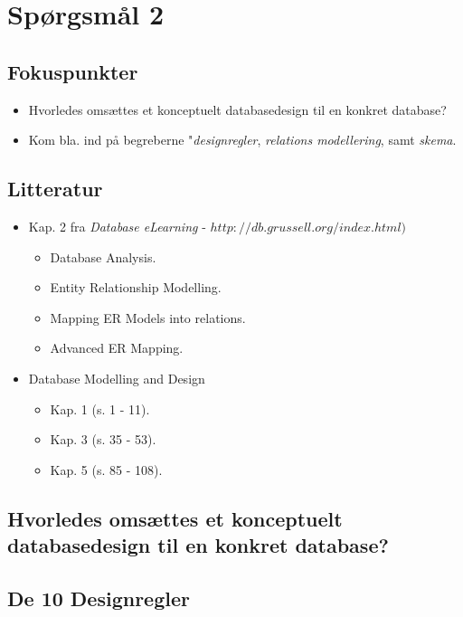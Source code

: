 \section{Spørgsmål 2}

\subsection{Fokuspunkter}
\begin{itemize}
	\item Hvorledes omsættes et konceptuelt databasedesign til en konkret database?
	\item Kom bla. ind på begreberne "\textit{designregler}, \textit{relations modellering}, samt \textit{skema}.
\end{itemize}

\subsection{Litteratur}
\begin{itemize}
	\item Kap. 2 fra \textit{Database eLearning} - $http://db.grussell.org/index.html)$
	\begin{itemize}
		\item Database Analysis.
		\item Entity Relationship Modelling.
		\item Mapping ER Models into relations.
		\item Advanced ER Mapping.
	\end{itemize}
	\item Database Modelling and Design
	\begin{itemize}
		\item Kap. 1 (s. 1 - 11).
		\item Kap. 3 (s. 35 - 53).
		\item Kap. 5 (s. 85 - 108).
	\end{itemize}
\end{itemize}

\newpage

\subsection{Hvorledes omsættes et konceptuelt databasedesign til en konkret database?}

\subsection{De 10 Designregler}


